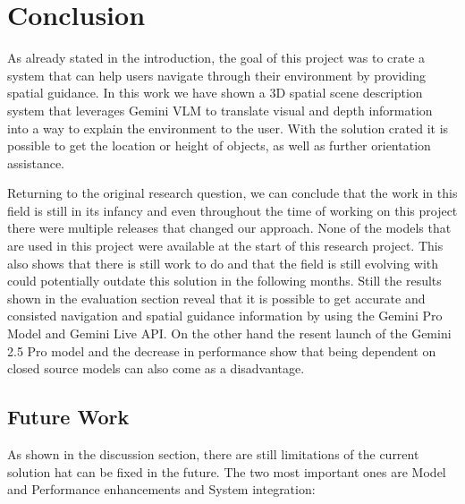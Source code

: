 \section{Conclusion}

As already stated in the introduction, the goal of this project was to crate a system that can help users navigate through their environment by providing spatial guidance.
In this work we have shown a 3D spatial scene description system that leverages Gemini VLM to translate visual and depth information into a way to explain the environment to the user.
With the solution crated it is possible to get the location or height of objects, as well as further orientation assistance.

Returning to the original research question, we can conclude that the work in this field is still in its infancy and even throughout the time of working on this project there were multiple releases that changed our approach.
None of the models that are used in this project were available at the start of this research project.
This also shows that there is still work to do and that the field is still evolving with could potentially outdate this solution in the following months.
Still the results shown in the evaluation section reveal that it is possible to get accurate and consisted navigation and spatial guidance information by using the Gemini Pro Model and Gemini Live API.
On the other hand the resent launch of the Gemini 2.5 Pro model and the decrease in performance show that being dependent on closed source models can also come as a disadvantage.

\subsection{Future Work}

As shown in the discussion section, there are still limitations of the current solution hat can be fixed in the future.
The two most important ones are Model and Performance enhancements and System integration:

